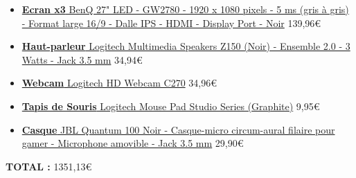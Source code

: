 \begin{itemize}
	\item \href{https://www.ldlc.com/fiche/PB00233120.html}{\textbf{Ecran x3} BenQ 27" LED - GW2780 - 1920 x 1080 pixels - 5 ms (gris à gris) - Format large 16/9 - Dalle IPS - HDMI - Display Port - Noir} 139,96\euro
	\item \href{https://www.ldlc.com/fiche/PB00154969.html}{\textbf{Haut-parleur} Logitech Multimedia Speakers Z150 (Noir) - Ensemble 2.0 - 3 Watts - Jack 3.5 mm} 34,94\euro
	\item \href{https://www.ldlc.com/fiche/PB00213751.html}{\textbf{Webcam} Logitech HD Webcam C270} 34,96\euro
	\item \href{https://www.ldlc.com/fiche/PB00466685.html}{\textbf{Tapis de Souris} Logitech Mouse Pad Studio Series (Graphite)} 9,95\euro
	\item \href{https://www.ldlc.com/fiche/PB00366138.html}{\textbf{Casque} JBL Quantum 100 Noir - Casque-micro circum-aural filaire pour gamer - Microphone amovible - Jack 3.5 mm} 29,90\euro
\end{itemize}
\vspace{5px}
\textbf{TOTAL :} 1351,13\euro

